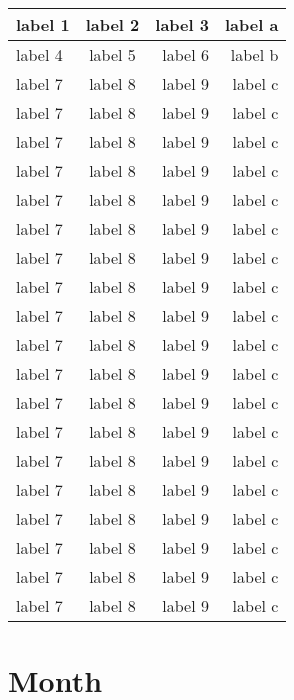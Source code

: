 \documentclass[a4paper,twoside,titlepage]{book}
\begin{document}
\begin{center}
\begin{longtable}{ | l | c | r | r | }
            \hline
            label 1 & label 2 & label 3 & label a \\ 
            \hline
            label 4 & label 5 & label 6 & label b \\ 
            \hline
            label 7 & label 8 & label 9 & label c \\
            \hline
            label 7 & label 8 & label 9 & label c \\
            \hline
            label 7 & label 8 & label 9 & label c \\
            \hline
            label 7 & label 8 & label 9 & label c \\
            \hline
            label 7 & label 8 & label 9 & label c \\
            \hline
            label 7 & label 8 & label 9 & label c \\
            \hline
            label 7 & label 8 & label 9 & label c \\
            \hline
            label 7 & label 8 & label 9 & label c \\
            \hline
            label 7 & label 8 & label 9 & label c \\
            \hline
            label 7 & label 8 & label 9 & label c \\
            \hline
            label 7 & label 8 & label 9 & label c \\
            \hline
            label 7 & label 8 & label 9 & label c \\
            \hline
            label 7 & label 8 & label 9 & label c \\
            \hline
            label 7 & label 8 & label 9 & label c \\
            \hline
            label 7 & label 8 & label 9 & label c \\
            \hline
            label 7 & label 8 & label 9 & label c \\
            \hline
            label 7 & label 8 & label 9 & label c \\
            \hline
            label 7 & label 8 & label 9 & label c \\
            \hline
            label 7 & label 8 & label 9 & label c \\
            \hline
          \end{longtable}
        \end{center}
      \section{Month}
\end{document}

